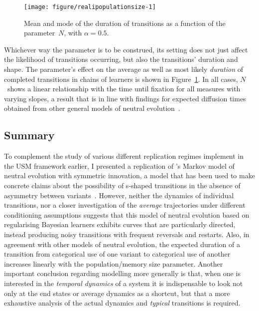 \begin{figure}[htbp]

{\centering \texttt{[image: figure/realipopulationsize-1]} 

}

\caption[Mean and mode of the duration of transitions as a function of the parameter~]{Mean and mode of the duration of transitions as a function of the parameter~$N$, with $\alpha=0.5$.}\label{fig:realipopulationsize}
\end{figure}



Whichever way the parameter is to be construed, its setting does not just affect the likelihood of transitions occurring, but also the transitions' duration and shape. The parameter's effect on the average as well as most likely \emph{duration} of completed transitions in chains of learners is shown in Figure~\ref{fig:realipopulationsize}. In all cases, $N$~shows a linear relationship with the time until fixation for all measures with varying slopes, a result that is in line with findings for expected diffusion times obtained from other general models of neutral evolution~\citep{Kimura1969}. %


\subsection{Summary}

To complement the study of various different replication regimes implement in the USM framework earlier, I presented a replication of \citeauthor{Reali2009}'s Markov model of neutral evolution with symmetric innovation, a model that has been used to make concrete claims about the possibility of s-shaped transitions in the absence of asymmetry between variants~\citep{Reali2010}.
However, neither the dynamics of individual transitions, nor a closer investigation of the \emph{average} trajectories under different conditioning assumptions suggests that this model of neutral evolution based on regularising Bayesian learners exhibits curves that are particularly directed, instead producing noisy transitions with frequent reversals and restarts.
Also, in agreement with other models of neutral evolution, the expected duration of a transition from categorical use of one variant to categorical use of another increases linearly with the population/memory size parameter.
Another important conclusion regarding modelling more generally is that, when one is interested in the \emph{temporal dynamics} of a system it is indispensable to look not only at the end states or average dynamics as a shortcut, but that a more exhaustive analysis of the actual dynamics and \emph{typical} transitions is required.
